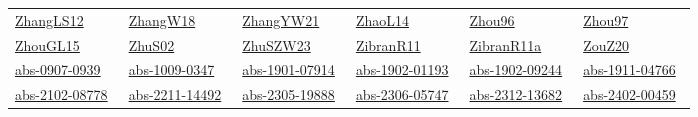 \begin{longtable}{*{6}{l}}
\href{../works/ZhangLS12.pdf}{ZhangLS12}~\cite{ZhangLS12} & \href{../works/ZhangW18.pdf}{ZhangW18}~\cite{ZhangW18} & \href{../works/ZhangYW21.pdf}{ZhangYW21}~\cite{ZhangYW21} & \href{../}{ZhaoL14}~\cite{ZhaoL14} & \href{../works/Zhou96.pdf}{Zhou96}~\cite{Zhou96} & \href{../works/Zhou97.pdf}{Zhou97}~\cite{Zhou97}\\ 
\href{../works/ZhouGL15.pdf}{ZhouGL15}~\cite{ZhouGL15} & \href{../works/ZhuS02.pdf}{ZhuS02}~\cite{ZhuS02} & \href{../works/ZhuSZW23.pdf}{ZhuSZW23}~\cite{ZhuSZW23} & \href{../works/ZibranR11.pdf}{ZibranR11}~\cite{ZibranR11} & \href{../works/ZibranR11a.pdf}{ZibranR11a}~\cite{ZibranR11a} & \href{../works/ZouZ20.pdf}{ZouZ20}~\cite{ZouZ20}\\ 
\href{../works/abs-0907-0939.pdf}{abs-0907-0939}~\cite{abs-0907-0939} & \href{../works/abs-1009-0347.pdf}{abs-1009-0347}~\cite{abs-1009-0347} & \href{../works/abs-1901-07914.pdf}{abs-1901-07914}~\cite{abs-1901-07914} & \href{../works/abs-1902-01193.pdf}{abs-1902-01193}~\cite{abs-1902-01193} & \href{../works/abs-1902-09244.pdf}{abs-1902-09244}~\cite{abs-1902-09244} & \href{../works/abs-1911-04766.pdf}{abs-1911-04766}~\cite{abs-1911-04766}\\ 
\href{../works/abs-2102-08778.pdf}{abs-2102-08778}~\cite{abs-2102-08778} & \href{../works/abs-2211-14492.pdf}{abs-2211-14492}~\cite{abs-2211-14492} & \href{../works/abs-2305-19888.pdf}{abs-2305-19888}~\cite{abs-2305-19888} & \href{../works/abs-2306-05747.pdf}{abs-2306-05747}~\cite{abs-2306-05747} & \href{../works/abs-2312-13682.pdf}{abs-2312-13682}~\cite{abs-2312-13682} & \href{../works/abs-2402-00459.pdf}{abs-2402-00459}~\cite{abs-2402-00459}\\ 
\end{longtable}
